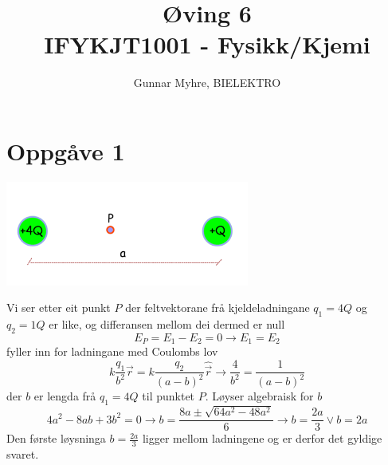 \documentclass[12pt,a4paper]{article}
\title{%
  Øving 6 \\
  \large IFYKJT1001 - Fysikk/Kjemi \\
  }
\author{Gunnar Myhre, BIELEKTRO}
\begin{document}
  \maketitle

  \section*{Oppgåve 1}
    \begin{center}
      \includegraphics[scale=0.6]{06_1.png}
    \end{center}
    Vi ser etter eit punkt $P$ der feltvektorane frå kjeldeladningane $q_1 = 4Q$ og $q_2 = 1Q$
    er like, og differansen mellom dei dermed er null
    \begin{equation}
      E_{P} = E_1 - E_2 = 0 \rightarrow E_1 = E_2
    \end{equation}
    fyller inn for ladningane med Coulombs lov
    \begin{equation}
      k\frac{q_1}{b^2}\hat{\vec{r}} = 
      k\frac{q_2}{(a-b)^2}\hat{\vec{r}} \rightarrow
      \frac{4}{b^2} = \frac{1}{(a-b)^2}
    \end{equation}
    der $b$ er lengda frå $q_1 = 4Q$ til punktet $P$. Løyser algebraisk for $b$
    \begin{equation}
      4a^2 - 8ab + 3b^2 = 0 \rightarrow b=\frac{8a\pm \sqrt{64a^2 - 48a^2}}{6}
      \rightarrow b=\frac{2a}{3} \vee b = 2a
    \end{equation}
    Den første løysninga $b= \frac{2a}{3}$ ligger mellom ladningene og er derfor
    det gyldige svaret.
\end{document}
